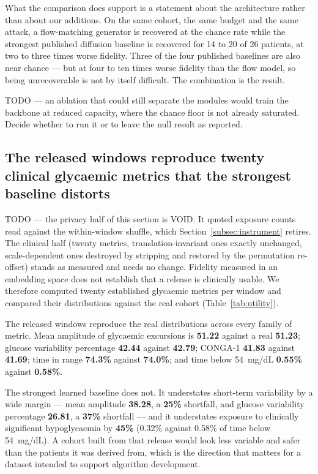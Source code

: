\documentclass[pdflatex,sn-nature]{sn-jnl}
\theoremstyle{thmstyleone}
\begin{document}
What the comparison does support is a statement about the architecture rather
than about our additions. On the same cohort, the same budget and the same
attack, a flow-matching generator is recovered at the chance rate while the
strongest published diffusion baseline is recovered for 14 to 20 of 26 patients,
at two to three times worse fidelity. Three of the four published baselines are
also near chance --- but at four to ten times worse fidelity than the flow model,
so being unrecoverable is not by itself difficult. The combination is the result.

TODO --- an ablation that could still separate the modules would train the
backbone at reduced capacity, where the chance floor is not already saturated.
Decide whether to run it or to leave the null result as reported.

\subsection{The released windows reproduce twenty clinical glycaemic metrics
that the strongest baseline distorts}\label{subsec:mitigation}

TODO --- the privacy half of this section is VOID. It quoted exposure counts
read against the within-window shuffle, which Section~\ref{subsec:instrument}
retires. The clinical half (twenty metrics, translation-invariant ones exactly
unchanged, scale-dependent ones destroyed by stripping and restored by the
permutation re-offset) stands as measured and needs no change.
Fidelity measured in an embedding space does not establish that a release is
clinically usable. We therefore computed twenty established glycaemic metrics
per window and compared their distributions against the real cohort
(Table~\ref{tab:utility}).

The released windows reproduce the real distributions across every family of
metric. Mean amplitude of glycaemic excursions is \textbf{51.22} against a real
\textbf{51.23}; glucose variability percentage \textbf{42.44} against
\textbf{42.79}; CONGA-1 \textbf{41.83} against \textbf{41.69}; time in range
\textbf{74.3\%} against \textbf{74.0\%}; and time below \mbox{54 mg/dL}
\textbf{0.55\%} against \textbf{0.58\%}.

The strongest learned baseline does not. It understates short-term variability
by a wide margin --- mean amplitude \textbf{38.28}, a \textbf{25\%} shortfall,
and glucose variability percentage \textbf{26.81}, a \textbf{37\%} shortfall ---
and it understates exposure to clinically significant hypoglycaemia by
\textbf{45\%} (0.32\% against 0.58\% of time below \mbox{54 mg/dL}). A cohort
built from that release would look less variable and safer than the patients it
was derived from, which is the direction that matters for a dataset intended to
support algorithm development.
\end{document}
